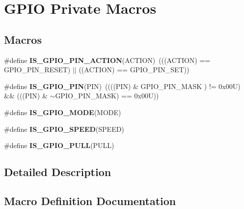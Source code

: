 \hypertarget{group___g_p_i_o___private___macros}{}\section{G\+P\+IO Private Macros}
\label{group___g_p_i_o___private___macros}
\subsection*{Macros}
\begin{DoxyCompactItemize}
\item 
\mbox{\label{group___g_p_i_o___private___macros_ga6da646a4924c5cfae3024c660476f26f}} 
\#define {\bfseries I\+S\+\_\+\+G\+P\+I\+O\+\_\+\+P\+I\+N\+\_\+\+A\+C\+T\+I\+ON}(A\+C\+T\+I\+ON)~(((A\+C\+T\+I\+ON) == G\+P\+I\+O\+\_\+\+P\+I\+N\+\_\+\+R\+E\+S\+ET) $\vert$$\vert$ ((A\+C\+T\+I\+ON) == G\+P\+I\+O\+\_\+\+P\+I\+N\+\_\+\+S\+ET))
\item 
\mbox{\label{group___g_p_i_o___private___macros_gad6ec74e33360395535ad5d91ba6d4781}} 
\#define {\bfseries I\+S\+\_\+\+G\+P\+I\+O\+\_\+\+P\+IN}(P\+IN)~((((P\+IN) \& G\+P\+I\+O\+\_\+\+P\+I\+N\+\_\+\+M\+A\+SK ) != 0x00\+U) \&\& (((\+P\+I\+N) \& $\sim$\+G\+P\+I\+O\+\_\+\+P\+I\+N\+\_\+\+M\+A\+S\+K) == 0x00\+U))
\item 
\#define {\bfseries I\+S\+\_\+\+G\+P\+I\+O\+\_\+\+M\+O\+DE}(M\+O\+DE)
\item 
\#define {\bfseries I\+S\+\_\+\+G\+P\+I\+O\+\_\+\+S\+P\+E\+ED}(S\+P\+E\+ED)
\item 
\#define {\bfseries I\+S\+\_\+\+G\+P\+I\+O\+\_\+\+P\+U\+LL}(P\+U\+LL)
\end{DoxyCompactItemize}


\subsection{Detailed Description}


\subsection{Macro Definition Documentation}
\mbox{\label{group___g_p_i_o___private___macros_gacc5fde3eef57ec3c558c11d0011d900c}} 
